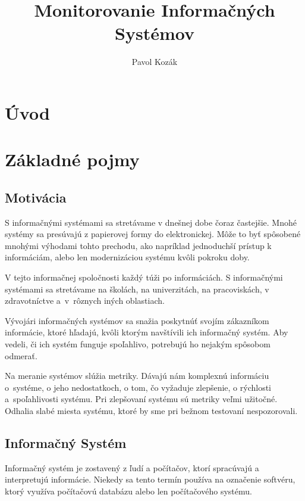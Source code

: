 \documentclass[a4paper, usesections, upjsfrontpage, thesismargins, thesislinespacing]{rnthesis}
\title{Monitorovanie Informačných Systémov}
\author{Pavol Kozák}
\begin{document}
\maketitle
\newpage

\setcounter{tocdepth}{3}
\tableofcontents

\newpage
\section*{Úvod}

\section{Základné pojmy}

\subsection{Motivácia}

S informačnými systémami sa stretávame v dnešnej dobe čoraz častejšie. 
Mnohé systémy sa presúvajú z papierovej formy do elektronickej.
Môže to byť spôsobené mnohými výhodami tohto prechodu, ako napríklad jednoduchší prístup k informáciám, alebo len modernizáciou systému kvôli pokroku doby.

V tejto informačnej spoločnosti každý túži po informáciách.
S informačnými systémami sa stretávame na školách, na univerzitách, na pracoviskách, v zdravot\-níc\-tve a~v~rôznych iných oblastiach.

Vývojári informačných systémov sa snažia poskytnúť svojím zákazníkom informácie, ktoré hľadajú, kvôli ktorým navštívili ich informačný systém.
Aby vedeli, či ich systém funguje spoľahlivo, potrebujú ho nejakým spôsobom odmerať.

Na meranie systémov slúžia metriky.
Dávajú nám komplexnú informáciu o~systéme, o jeho nedostatkoch, o tom, čo vyžaduje zlepšenie, o rýchlosti a~spoľahli\-vos\-ti systému.
Pri zlepšovaní systému sú metriky veľmi užitočné.
Odhalia slabé miesta systému, ktoré by sme pri bežnom testovaní nespozorovali.

\subsection{Informačný Systém}

Informačný systém je zostavený z ľudí a počítačov, ktorí spracúvajú a interpretujú informácie.
Niekedy sa tento termín používa na označenie softvéru, ktorý využíva počítačovú databázu alebo len počítačového systému.
\end{document}

